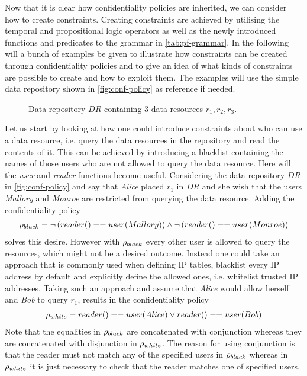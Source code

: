Now that it is clear how confidentiality policies are inherited, we can consider how to create constraints. Creating constraints are achieved by utilising the temporal and propositional logic operators as well as the newly introduced functions and predicates to the grammar in \autoref{tab:pf-grammar}. In the following will a bunch of examples be given to illustrate how constraints can be created through confidentiality policies and to give an idea of what kinds of constraints are possible to create and how to exploit them. The examples will use the simple data repository shown in \autoref{fig:conf-policy} as reference if needed.

\begin{figure}[!ht]
    \begin{center}
        
        \caption{Data repository $DR$ containing 3 data resources $r_1, r_2, r_3$.}
        \label{fig:conf-policy}
    \end{center}
\end{figure}

\begin{example}\label{ex:conf-reader-constraints}
Let us start by looking at how one could introduce constraints about who can use a data resource, i.e. query the data resources in the repository and read the contents of it. This can be achieved by introducing a blacklist containing the names of those users who are not allowed to query the data resource. Here will the \emph{user} and \emph{reader} functions become useful. Considering the data repository $DR$ in \autoref{fig:conf-policy} and say that \emph{Alice} placed $r_1$ in $DR$ and she wish that the users \emph{Mallory} and \emph{Monroe} are restricted from querying the data resource. Adding the confidentiality policy 
\begin{align*}
    \rho_{black} = \lnot \left( reader() == user(Mallory) \right) \land \lnot \left( reader() == user(Monroe) \right)
\end{align*}
solves this desire. However with $\rho_{black}$ every other user is allowed to query the resources, which might not be a desired outcome. Instead one could take an approach that is commonly used when defining IP tables, blacklist every IP address by default and explicitly define the allowed ones, i.e. whitelist trusted IP addresses. Taking such an approach and assume that \emph{Alice} would allow herself and \emph{Bob} to query $r_1$, results in the confidentiality policy
\begin{align*}
    \rho_{white} = reader() == user(Alice) \lor reader() == user(Bob)
\end{align*}
Note that the equalities in $\rho_{black}$ are concatenated with conjunction whereas they are concatenated with disjunction in $\rho_{white}$. The reason for using conjunction is that the reader must not match any of the specified users in $\rho_{black}$ whereas in $\rho_{white}$ it is just necessary to check that the reader matches one of specified users.
\end{example}

